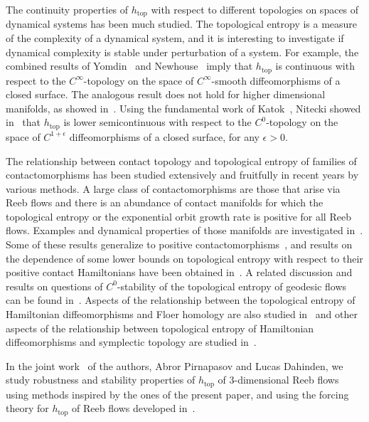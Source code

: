 \documentclass[AHL,Unicode,longabstracts,published]{cedram}
\newcommand{\topo}{\mathrm{top}}
\newcommand{\topo}{\mathrm{top}}
\begin{document}
\begin{rema}
The continuity properties of $h_{\topo}$ with respect to different topologies on spaces of dynamical systems has been much studied. The topological entropy is a measure of the complexity of a dynamical system, and it is interesting to investigate if dynamical complexity is stable under perturbation of a system. For example, the combined results of Yomdin~\cite{Yomdin1987} and Newhouse~\cite{Newhouse} imply that $h_{\topo}$ is continuous with respect to the $C^\infty$-topology on the space of $C^\infty$-smooth diffeomorphisms of a closed surface. The analogous result does not hold for higher dimensional manifolds, as showed in~\cite{Misiurewicz}. Using the fundamental work of Katok~\cite{Katok}, Nitecki showed in~\cite{nitecki} that $h_{\topo}$ is lower semicontinuous with respect to the $C^0$-topology on the space of $C^{1+\epsilon}$ diffeomorphisms of a closed surface, for any $\epsilon>0$.
\end{rema}

The relationship between contact topology and topological entropy of families of contactomorphisms has been studied extensively and fruitfully in recent years by various methods. A large class of contactomorphisms are those that arise via Reeb flows and there is an abundance of contact manifolds for which the topological entropy or the exponential orbit growth rate is positive for all Reeb flows. Examples and dynamical properties of those manifolds are investigated in~\cite{AASS,AlvesMeiwes2018,Alves-Cylindrical,Alves-Anosov,A2,AlvesColinHonda2017,
FrauenfelderSchlenk2006,
MacariniSchlenk2011}. Some of these results generalize to positive contactomorphisms~\cite{Dahinden,Dahinden2}, and results on the dependence of some lower bounds on topological entropy with respect to their positive contact Hamiltonians have been obtained in~\cite{DahindenC0}. A related discussion and results on questions of $C^0$-stability of the topological entropy of geodesic flows can be found in~\cite{ADMM}. Aspects of the relationship between the topological entropy of Hamiltonian diffeomorphisms and Floer homology are also studied in~\cite{chor-meiwes,CGG,FrauenfelderSchlenk2006} and other aspects of the relationship between topological entropy of Hamiltonian diffeomorphisms and symplectic topology are studied in~\cite{BM-quasi,Khanevsky}.


In the joint work~\cite{ADMP} of the authors, Abror Pirnapasov and Lucas Dahinden, we study robustness and stability properties of $h_{\topo}$ of $3$-dimensional Reeb flows using methods inspired by the ones of the present paper, and using the forcing theory for $h_{\topo}$ of Reeb flows developed in~\cite{AlvesPirnapasov}.
\end{document}
